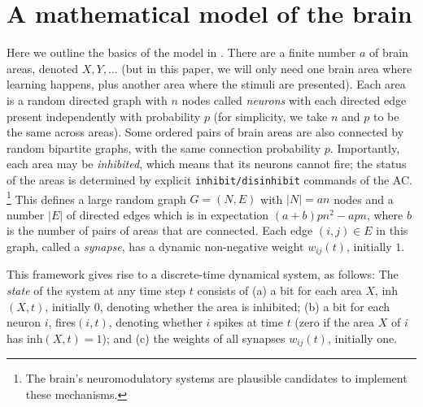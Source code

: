 \documentclass[final,12pt]{colt2022} %
\begin{document}
\section{A mathematical model of the brain} 
Here we outline the basics of the model in \citet{papadimitriou2020brain}.  There are a finite number $a$ of brain areas, denoted $X, Y, \ldots$ (but in this paper, we will only need one brain area where learning happens, plus another area where the stimuli are presented).  Each area is a random directed graph with $n$ nodes called {\em neurons} with each directed edge present independently with probability $p$ (for simplicity, we take $n$ and $p$ to be the same across areas).  Some ordered pairs of brain areas are also connected by random bipartite graphs, with the same connection probability $p$.  Importantly, each area may be {\em inhibited}, which means that its neurons cannot fire; the status of the areas is determined by explicit {\tt inhibit/disinhibit} commands of the AC. \footnote{The brain's neuromodulatory systems \citep{jones2003arousal, harris2011cortical} are plausible candidates to implement these mechanisms.} This defines a large random graph $G=(N,E)$ with $|N|=an$ nodes and a number $|E|$ of directed edges which is in expectation $(a+b)pn^2-apn$, where $b$ is the number of pairs of areas that are connected. Each edge $(i,j)\in E$ in this graph, called a {\em synapse}, has a dynamic non-negative weight $w_{ij}(t)$, initially $1$. 

This framework gives rise to a discrete-time dynamical system, as follows: The {\em state} of the system at any time step $t$ consists of (a) a bit for each area $X$, inh$(X,t)$, initially $0$, denoting whether the area is inhibited; (b) a bit for each neuron $i$, fires$(i,t)$, denoting whether $i$ spikes at time $t$ (zero if the area $X$ of $i$ has inh$(X,t)=1$); and (c) the weights of all synapses $w_{ij}(t)$, initially one.  
\end{document}
